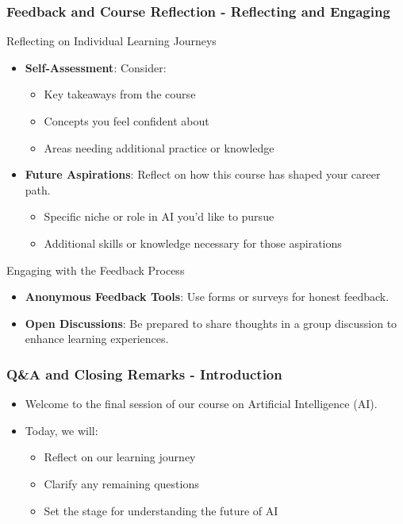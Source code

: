 \documentclass{beamer}
\begin{document}
\begin{frame}[fragile]
    \frametitle{Feedback and Course Reflection - Reflecting and Engaging}
    \begin{block}{Reflecting on Individual Learning Journeys}
        \begin{itemize}
            \item \textbf{Self-Assessment}: Consider:
                \begin{itemize}
                    \item Key takeaways from the course
                    \item Concepts you feel confident about
                    \item Areas needing additional practice or knowledge
                \end{itemize}
            \item \textbf{Future Aspirations}: Reflect on how this course has shaped your career path.
                \begin{itemize}
                    \item Specific niche or role in AI you’d like to pursue
                    \item Additional skills or knowledge necessary for those aspirations
                \end{itemize}
        \end{itemize}
    \end{block}
    
    \begin{block}{Engaging with the Feedback Process}
        \begin{itemize}
            \item \textbf{Anonymous Feedback Tools}: Use forms or surveys for honest feedback.
            \item \textbf{Open Discussions}: Be prepared to share thoughts in a group discussion to enhance learning experiences.
        \end{itemize}
    \end{block}
\end{frame}

\begin{frame}[fragile]
    \frametitle{Q\&A and Closing Remarks - Introduction}
    \begin{itemize}
        \item Welcome to the final session of our course on Artificial Intelligence (AI).
        \item Today, we will:
        \begin{itemize}
            \item Reflect on our learning journey
            \item Clarify any remaining questions
            \item Set the stage for understanding the future of AI
        \end{itemize}
    \end{itemize}
\end{frame}
\end{document}

